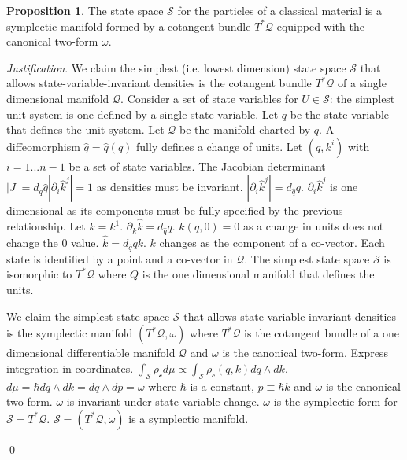 \documentclass[aps,pra,10pt,twocolumn,floatfix,nofootinbib]{revtex4-1}
\numberwithin{equation}{section}
\theoremstyle{definition}
\newtheorem{prop}[equation]{Proposition}
\newenvironment{justification}{\emph{Justification}.}{\qed}
\begin{document}
\begin{prop}\label{prop:symplectic_manifold}
The state space $\mathcal{S}$ for the particles of a classical material is a symplectic manifold formed by a cotangent bundle $T^*\mathcal{Q}$ equipped with the canonical two-form $\omega$.
\end{prop}

\begin{justification}
	We claim the simplest (i.e. lowest dimension) state space $\mathcal{S}$ that allows state-variable-invariant densities is the cotangent bundle $T^*\mathcal{Q}$ of a single dimensional manifold $\mathcal{Q}$. Consider a set of state variables for $U \in \mathcal{S}$: the simplest unit system is one defined by a single state variable. Let $q$ be the state variable that defines the unit system. Let $\mathcal{Q}$ be the manifold charted by $q$. A diffeomorphism $\hat{q}=\hat{q}(q)$ fully defines a change of units. Let $(q,k^i)$ with $i=1...n-1$ be a set of state variables. The Jacobian determinant $|J| = d_q\hat{q} |\partial_i\hat{k}^j|=1$ as densities must be invariant. $|\partial_i \hat{k}^j| = d_{\hat{q}}q$. $\partial_i \hat{k}^j$ is one dimensional as its components must be fully specified by the previous relationship. Let $k=k^1$. $\partial_k \hat{k} = d_{\hat{q}}q$. $\hat{k}(q,0) = 0$ as a change in units does not change the $0$ value. $\hat{k} = d_{\hat{q}}q k$. $k$ changes as the component of a co-vector. Each state is identified by a point and a co-vector in $\mathcal{Q}$. The simplest state space $\mathcal{S}$ is isomorphic to $T^*\mathcal{Q}$ where $Q$ is the one dimensional manifold that defines the units.
	
	We claim the simplest state space $\mathcal{S}$ that allows state-variable-invariant densities is the symplectic manifold $(T^*\mathcal{Q}, \omega)$ where $T^*\mathcal{Q}$ is the cotangent bundle of a one dimensional differentiable manifold $\mathcal{Q}$ and $\omega$ is the canonical two-form. Express integration in coordinates. $\int_{\mathcal{S}} \rho_\mathcal{c} d\mu \propto \int_{\mathcal{S}} \rho_\mathcal{c}(q, k) dq \wedge dk$. $d\mu = \hbar dq \wedge dk = dq \wedge dp = \omega$ where $\hbar$ is a constant, $p\equiv \hbar k$  and $\omega$ is the canonical two form. $\omega$ is invariant under state variable change. $\omega$ is the symplectic form for $\mathcal{S}=T^*\mathcal{Q}$. $\mathcal{S} = (T^*\mathcal{Q}, \omega)$ is a symplectic manifold.
	

\end{justification}
\end{document}

